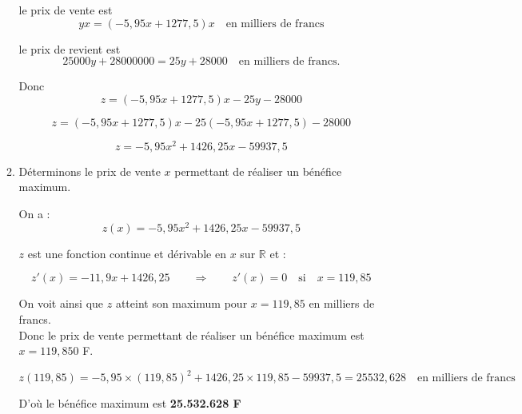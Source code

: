 \documentclass[12pt,a4paper]{article}
\begin{document}
\begin{enumerate}
\begin{enumerate}
\vspace{0.3cm}

le prix de vente est \quad 
\[
yx = (-5{,}95x + 1277{,}5)x \quad \text{en milliers de francs}
\]

le prix de revient est \quad 
\[
25000y + 28000000 = 25y + 28000 \quad \text{en milliers de francs.}
\]

Donc \quad
\[
z = (-5{,}95x + 1277{,}5)x - 25y - 28000
\]

\[
z = (-5{,}95x + 1277{,}5)x - 25(-5{,}95x + 1277{,}5) - 28000
\]

\[
z = -5{,}95x^2 + 1426{,}25x - 59937{,}5
\]

    \item Déterminons le prix de vente \( x \) permettant de réaliser un bénéfice maximum.

\vspace{0.2cm}

On a : 
\[
z(x) = -5{,}95x^2 + 1426{,}25x - 59937{,}5
\]

\( z \) est une fonction continue et dérivable en \( x \) sur \( \mathbb{R} \) et :

\[
z'(x) = -11{,}9x + 1426{,}25
\qquad \Rightarrow \qquad
z'(x) = 0 \quad \text{si} \quad x = 119{,}85
\]

\vspace{0.3cm}

On voit ainsi que \( z \) atteint son maximum pour \( x = 119{,}85 \) en milliers de francs.\\
Donc le prix de vente permettant de réaliser un bénéfice maximum est \( x = 119{,}850 \) F.

\vspace{0.3cm}

\[
z(119{,}85) = -5{,}95 \times (119{,}85)^2 + 1426{,}25 \times 119{,}85 - 59937{,}5 = 25532{,}628
\quad \text{en milliers de francs}
\]

\vspace{0.3cm}

D’où le bénéfice maximum est \quad \textbf{25.532.628 F}

\end{enumerate}
\end{enumerate}
\end{document}
